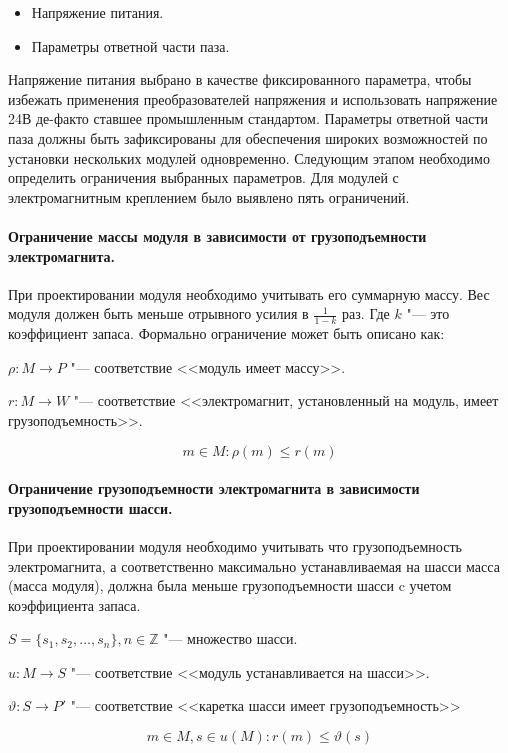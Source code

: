 \begin{itemize}
	\item Напряжение питания.
	\item Параметры ответной части паза.
\end{itemize}

Напряжение питания выбрано в качестве фиксированного параметра, чтобы избежать применения преобразователей напряжения и использовать напряжение 24В де-факто ставшее промышленным стандартом. Параметры ответной части паза должны быть зафиксированы для обеспечения  широких возможностей по установки нескольких модулей одновременно. Следующим этапом необходимо определить ограничения выбранных параметров. Для модулей с электромагнитным креплением было выявлено пять ограничений.

\paragraph{Ограничение массы модуля в зависимости от грузоподъемности электромагнита.} При проектировании модуля необходимо учитывать его суммарную массу. Вес модуля должен быть меньше отрывного усилия в $\frac{1}{1-k}$ раз. Где $k$ "--- это коэффициент запаса. Формально ограничение может быть описано как:

\noindent $\rho : M \rightarrow P$ "--- соответствие <<модуль имеет массу>>.

\noindent $r : M \rightarrow W$ "--- соответствие <<электромагнит, установленный на модуль, имеет грузоподъемность>>.

\[
m \in M: \rho(m) \leq r(m)
\]

\paragraph{Ограничение грузоподъемности электромагнита в зависимости грузоподъемности шасси.} При проектировании модуля необходимо учитывать что грузоподъемность электромагнита, а соответственно максимально устанавливаемая на шасси масса (масса модуля), должна была меньше грузоподъемности шасси c учетом коэффициента запаса.

\noindent $S = \{s_1, s_2, \ldots, s_n\}, n \in \mathbb{Z} $ "--- множество шасси.

\noindent $u: M \rightarrow S$ "--- соответствие <<модуль устанавливается  на шасси>>. 

\noindent $\vartheta: S \rightarrow P'$ "--- соответствие <<каретка шасси имеет грузоподъемность>> 

\[
m \in M, s \in u(M): r(m) \leq \vartheta(s)
\]

